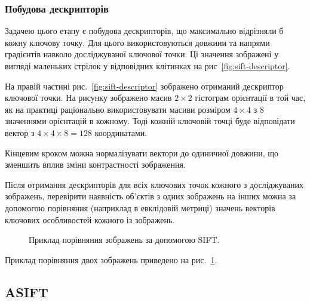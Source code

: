 \subsubsection{Побудова дескрипторів}

Задачею цього етапу є побудова дескрипторів, що максимально відрізняли б кожну ключову точку. Для цього використовуються довжини та напрями градієнтів навколо досліджуваної ключової точки. Ці значення зображені у вигляді маленьких стрілок у відповідних клітинках на рис~\ref{fig:sift-descriptor}.

На правій частині рис.~\ref{fig:sift-descriptor} зображено отриманий дескриптор ключової точки. На рисунку зображено масив $2\times2$ гістограм орієнтації в той час, як на практиці раціонально використовувати масиви розміром $4\times4$ з 8 значеннями орієнтацій в кожному. Тоді кожній ключовій точці буде відповідати вектор з $4\times4\times8=128$ координатами. 

Кінцевим кроком можна нормалізувати вектори до одиничної довжини, що зменшить вплив зміни контрастності зображення.

Після отримання дескрипторів для всіх ключових точок кожного з досліджуваних зображень, перевірити наявність об'єктів з одних зображень на інших можна за допомогою порівняння (наприклад в евклідовій метриці) значень векторів ключових особливостей кожного із зображень. 

\begin{figure}[h]
  \begin{minipage}[h]{0.49\linewidth}
  \end{minipage}
  \hfill
  \begin{minipage}[h]{0.49\linewidth}
  \end{minipage}
  \label{fig:sift-sample}
  \caption{Приклад порівняння зображень за допомогою SIFT.}
\end{figure}

Приклад порівняння двох зображень приведено на рис.~\ref{fig:sift-sample}.

\subsection{ASIFT}
\label{sec:asift}

